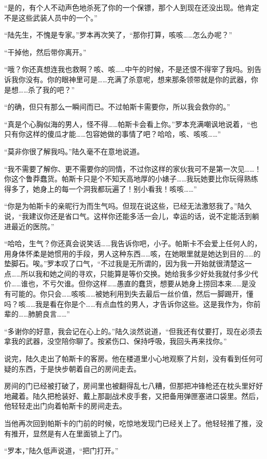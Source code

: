 “是的，有个人不动声色地杀死了你的一个保镖，那个人到现在还没出现。他肯定不是这些武装人员中的一个。”

“陆先生，不愧是专家。”罗本再次笑了，“那你打算，咳咳……怎么办呢？”

“干掉他，然后带你离开。”

“哦？你还真想连我也救啊？咳、咳……中午的时候，不是还恨不得宰了我吗。别告诉我你没有。你的眼神里可是……充满了杀意呢，想来那条领带就是你的武器，你是想……杀了我的吧？”

“的确，但只有那么一瞬间而已。不过帕斯卡需要你，所以我会救你的。”

“真是个心胸似海的男人，怪不得……帕斯卡会看上你。”罗本充满嘲讽地说着，“也只有你这样的傻瓜才能……包容她做的事情了吧？哈哈，咳、咳咳……”

“莫非你很了解我吗。”陆久毫不在意地说道。

“我不需要了解你、更不需要你的同情，不过你这样的家伙我可不是第一次见……！你这个鲁莽蠢货。帕斯卡只是个不知天高地厚的小婊子……我玩她要比你玩得熟练得多了，她身上的每一个洞我都玩遍了！别小看我！咳咳……”

“你是为帕斯卡的亲昵行为而生气吗。但现在说这些，已经无法激怒我了。”陆久说，“我建议你还是省口气。这样你还能多活一会儿，幸运的话，说不定能活到躺进最近的医院。”

“哈哈，生气？你还真会说笑话……我告诉你吧，小子。帕斯卡不会爱上任何人的，用身体怀柔是她惯用的手段，男人这种东西……咳，在她眼里就是她达到目的……的垫脚石。唉。”罗本叹了口气，“不过我是无所谓的，因为我一开始就很清楚这一点……所以我和她之间的寻欢，只能算是等价交换。她给我多少好处我就付多少代价……谁也，不亏欠谁。但你这样……愚直的蠢货，想要从她身上捞回本来……是没有可能的。你只会……咳咳……被她利用到失去最后一丝价值，然后一脚踢开，懂吗？咳……我是看在你是个……有点血性的男人，才告诉你这些。这是我作为，你前辈的……肺腑良言……”

“多谢你的好意，我会记在心上的。”陆久淡然说道，“但我还有仗要打，现在必须去拿我的武器，没空陪你聊了。按紧伤口、保持呼吸，我回头再来找你。”

说完，陆久走出了帕斯卡的客房。他在楼道里小心地观察了片刻，没有看到任何可疑的东西，于是快步朝着自己的房间走去。

房间的门已经被打破了，房间里也被翻得乱七八糟，但那把冲锋枪还在枕头里好好地藏着。陆久把枪装好、戴上那副战术皮手套，又把备用弹匣塞进口袋里。然后，他轻轻走出门向着帕斯卡的房间走去。

当他再次回到帕斯卡的门前的时候，吃惊地发现门已经关上了。他轻轻推了推，没有推开，显然是有人在里面锁上了门。

“罗本，”陆久低声说道，“把门打开。”

